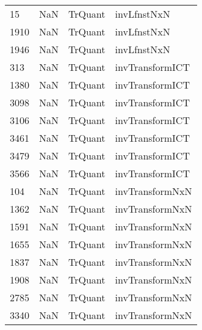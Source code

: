 \begin{tabular}{llll}
15   &                   NaN &                    TrQuant &                               invLfnstNxN \\
1910 &                   NaN &                    TrQuant &                               invLfnstNxN \\
1946 &                   NaN &                    TrQuant &                               invLfnstNxN \\
313  &                   NaN &                    TrQuant &                           invTransformICT \\
1380 &                   NaN &                    TrQuant &                           invTransformICT \\
3098 &                   NaN &                    TrQuant &                           invTransformICT \\
3106 &                   NaN &                    TrQuant &                           invTransformICT \\
3461 &                   NaN &                    TrQuant &                           invTransformICT \\
3479 &                   NaN &                    TrQuant &                           invTransformICT \\
3566 &                   NaN &                    TrQuant &                           invTransformICT \\
104  &                   NaN &                    TrQuant &                           invTransformNxN \\
1362 &                   NaN &                    TrQuant &                           invTransformNxN \\
1591 &                   NaN &                    TrQuant &                           invTransformNxN \\
1655 &                   NaN &                    TrQuant &                           invTransformNxN \\
1837 &                   NaN &                    TrQuant &                           invTransformNxN \\
1908 &                   NaN &                    TrQuant &                           invTransformNxN \\
2785 &                   NaN &                    TrQuant &                           invTransformNxN \\
3340 &                   NaN &                    TrQuant &                           invTransformNxN \\

\end{tabular}
